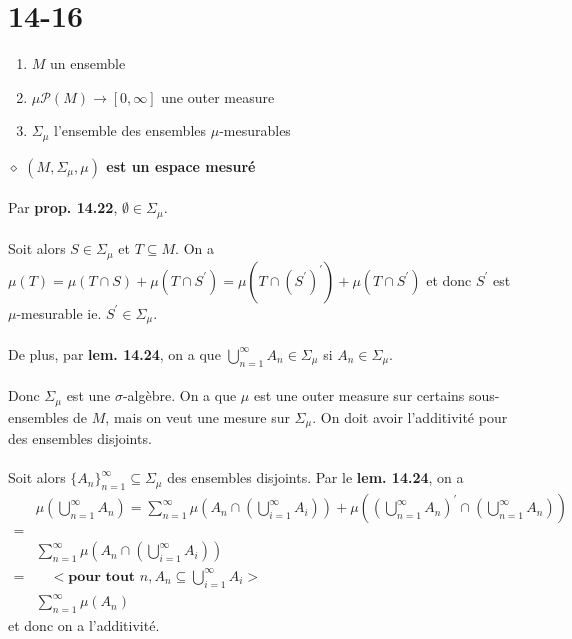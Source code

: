\documentclass[a4paper,10pt]{article}
\begin{document}
\section*{14-16}
\begin{enumerate}
	\item $M$ un ensemble
	\item $\mu \mathcal{P} (M) \rightarrow [0, \infty]$ une outer measure
	\item $\Sigma_\mu$ l'ensemble des ensembles $\mu$-mesurables
\end{enumerate}
$\diamond$ \textbf{$(M, \Sigma_\mu, \mu)$ est un espace mesuré}
\\
\\
Par \textbf{prop. 14.22}, $\emptyset \in \Sigma_\mu$. 
\\
\\
Soit alors $S \in \Sigma_\mu$ et $T \subseteq M$. On a $\mu (T) = \mu (T \cap S) + \mu (T \cap S^\prime) = \mu (T \cap (S^\prime)^\prime) + \mu (T \cap S^\prime)$ et donc $S^\prime$ est $\mu$-mesurable ie. $S^\prime \in \Sigma_\mu$.
\\
\\
De plus, par \textbf{lem. 14.24}, on a que $\bigcup_{n=1}^\infty A_n \in \Sigma_\mu$ si $A_n \in \Sigma_\mu$.
\\
\\
Donc $\Sigma_\mu$ est une $\sigma$-algèbre. On a que $\mu$ est une outer measure sur certains sous-ensembles de $M$, mais on veut une mesure sur $\Sigma_\mu$. On doit avoir l'additivité pour des ensembles disjoints.
\\
\\
Soit alors $\{A_n\}_{n=1}^\infty \subseteq \Sigma_\mu$ des ensembles disjoints. Par le \textbf{lem. 14.24}, on a 
\begin{align*}
	& \mu \left(\bigcup_{n=1}^\infty A_n \right) = \sum_{n=1}^\infty \mu \left(A_n \cap \left(\bigcup_{i=1}^\infty A_i \right)\right) + \mu \left(\left(\bigcup_{n=1}^\infty A_n \right)^\prime \cap \left(\bigcup_{n=1}^\infty A_n \right)\right) \\
	= \\
	& \sum_{n=1}^\infty \mu \left( A_n \cap \left(\bigcup_{i=1}^\infty A_i \right) \right) \\
	= & \quad <\textbf{pour tout } n, A_n \subseteq \bigcup_{i=1}^\infty A_i> \\
	& \sum_{n=1}^\infty \mu (A_n)	
\end{align*}
et donc on a l'additivité.
\end{document}
